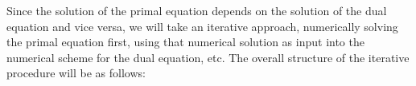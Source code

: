 Since the solution of the primal equation depends on the solution of the dual equation and vice versa, we will take an iterative approach, numerically solving the primal equation first, using that numerical solution as input into the numerical scheme for the dual equation, etc. The overall structure of the iterative procedure will be as follows:



